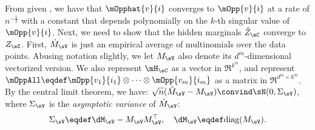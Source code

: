 From \citet{anandkumar13tensor} given ,
we have that $\mOpphat{v}{i}$ converges to $\mOpp{v}{i}$ at a rate of $n^{-\frac12}$ with a constant that
depends polynomially on the $k$-th singular value of $\mOpp{v}{i}$.
Next, we need to show that the hidden marginals $\hat Z_\sC$ converge to $Z_\sC$.
First, $\hat M_\sV$ is just an empirical average of multinomials over the data points.
Abusing notation slightly, we let $M_\sV$ also denote its $d^{m}$-dimensional vectorized version.
We also represent $\mH_\sC$ as
  a vector in $\Re^{k^m}$, and represent $\mOppAll \eqdef
  \mOpp{v_1}{i_1} \otimes \cdots \otimes
  \mOpp{v_m}{i_m}$ as a matrix in $\Re^{d^m \times
  k^m}$.
By the central limit theorem, we have:
$\sqrt{n} (\hat M_\sV - M_\sV) \convind \sN(0, \Sigma_\sV)$,
where $\Sigma_\sV$ is the \emph{asymptotic variance} of $\hat M_\sV$: 
\begin{align*}
\Sigma_\sV \eqdef \dM_\sV - M_\sV M_\sV^\top, \quad \dM_\sV \eqdef \text{diag}(M_\sV).
\end{align*}


